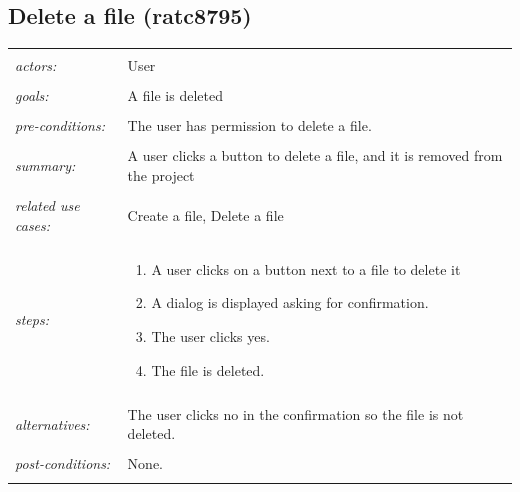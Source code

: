 \documentclass[11pt]{report}
\begin{document}
\begin{IDE-like Features}
\begin{}
\begin{Collaborative features that would be "nice":}
\subsection{Delete a file (ratc8795)}
\begin{tabular}{ p{2cm} p{12cm} }
 \hline
 \\
 \textit{actors:} & User \\ 
 \\
 \textit{goals:} & A file is deleted \\
 \\
 \textit{pre-conditions:} & The user has permission to delete a file. \\
 \\
 \textit{summary:} & A user clicks a button to delete a file, and it is removed from the project \\ 
 \\
 \textit{related use cases:} & Create a file, Delete a file \\ 
 \\
 \textit{steps:} & \begin{enumerate}
  \item A user clicks on a button next to a file to delete it
  \item A dialog is displayed asking for confirmation.
  \item The user clicks yes.
  \item The file is deleted.
 \end{enumerate} \\
 \\
 \textit{alternatives:} & The user clicks no in the confirmation so the file is not deleted. \\
 \\
 \textit{post-conditions:} & None. \\
 \\
\hline
\end{tabular}


\end{Collaborative features that would be "nice":}
\end{}
\end{IDE-like Features}
\end{document}
